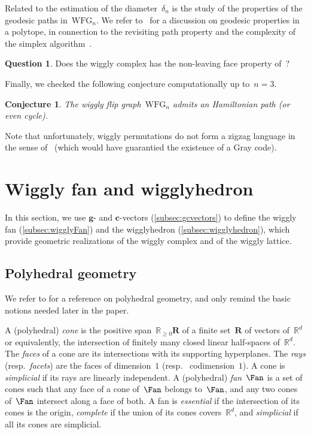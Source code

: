 \documentclass{amsart}
\newtheorem{conjecture}[theorem]{Conjecture}
\theoremstyle{definition}
\newtheorem{question}[theorem]{Question}
\newcommand{\R}{\mathbb{R}} %
\renewcommand{\b}[1]{{\boldsymbol{#1}}} %
\newcommand{\darkblue}{\color{darkblue}} %
\newcommand{\defn}[1]{\textsl{\darkblue #1}} %
\newcommand{\wigglyFlipGraph}{\mathrm{WFG}} %
\begin{document}
Related to the estimation of the diameter~$\delta_n$ is the study of the properties of the geodesic paths in~$\wigglyFlipGraph_n$.
We refer to~\cite{CeballosPilaud-diameterDAssociahedron} for a discussion on geodesic properties in a polytope, in connection to the revisiting path property and the complexity of the simplex algorithm~\cite{Santos-surveyHirsch,Santos-Hirsch}.

\begin{question}
Does the wiggly complex has the non-leaving face property of~\cite{CeballosPilaud-diameterDAssociahedron}?
\end{question}

Finally, we checked the following conjecture computationally up to~$n = 3$.

\begin{conjecture}
\label{conj:Hamiltonian}
The wiggly flip graph~$\wigglyFlipGraph_n$ admits an Hamiltonian path (or even cycle).
\end{conjecture}

Note that unfortunately, wiggly permutations do not form a zigzag language in the sense of~\cite{HartungHoangMutzeWilliams} (which would have guarantied the existence of a Gray code).


\pagebreak
\section{Wiggly fan and wigglyhedron}
\label{sec:geometry}

In this section, we use $\b{g}$- and $\b{c}$-vectors (\cref{subsec:gcvectors}) to define the wiggly fan (\cref{subsec:wigglyFan}) and the wigglyhedron (\cref{subsec:wigglyhedron}), which provide geometric realizations of the wiggly complex and of the wiggly lattice.


\subsection{Polyhedral geometry}
\label{subsec:polyhedralGeometry}

We refer to \cite{Ziegler-polytopes} for a reference on polyhedral geometry, and only remind the basic notions needed later in the paper.

A (polyhedral) \defn{cone} is the positive span~$\R_{\ge 0}\b{R}$ of a finite set~$\b{R}$ of vectors of~$\R^d$ or equivalently, the intersection of finitely many closed linear half-spaces of~$\R^d.$ 
The \defn{faces} of a cone are its intersections with its supporting hyperplanes. 
The \defn{rays} (resp.~\defn{facets}) are the faces of dimension~$1$ (resp.~ codimension~$1$).
A cone is \defn{simplicial} if its rays are linearly independent.
A (polyhedral) \defn{fan}~$\Fan$ is a set of cones such that any face of a cone of~$\Fan$ belongs to~$\Fan$, and any two cones of~$\Fan$ intersect along a face of both. 
A fan is \defn{essential} if the intersection of its cones is the origin, \defn{complete} if the union of its cones covers~$\R^d$, and \defn{simplicial} if all its cones are simplicial.
\end{document}
